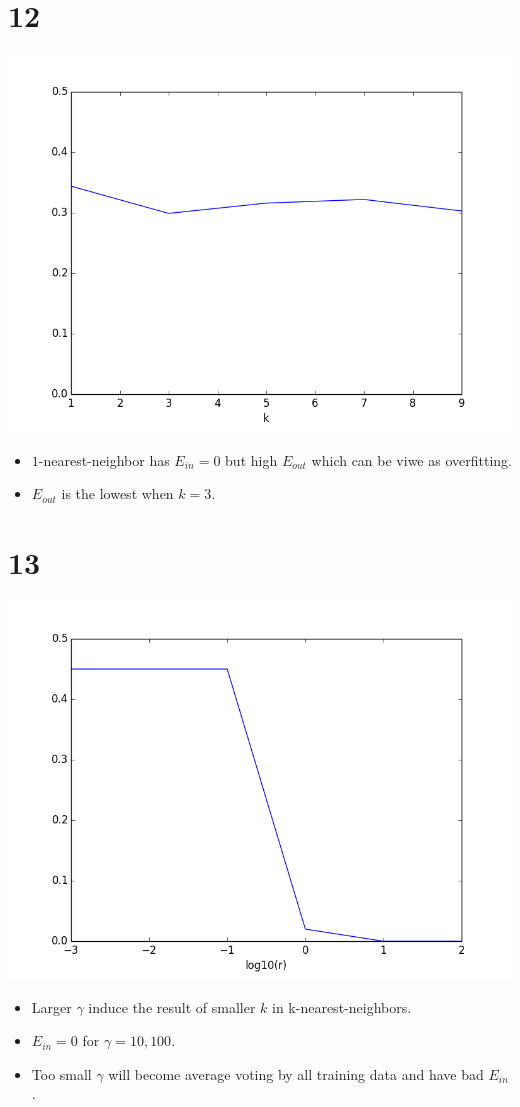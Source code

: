 \documentclass[12pt]{article}
\begin{document}
\section*{12}
\begin{center}
    \includegraphics[scale=0.5]{p12.png}
\end{center}
\begin{itemize}
    \item $1$-nearest-neighbor has $E_{in}=0$ but high $E_{out}$ which can be viwe as overfitting.
    \item $E_{out}$ is the lowest when $k=3$.
\end{itemize}

\section*{13}
\begin{center}
    \includegraphics[scale=0.5]{p13.png}
\end{center}
\begin{itemize}
    \item Larger $\gamma$ induce the result of smaller $k$ in k-nearest-neighbors.
    \item $E_{in}=0$ for $\gamma=10, 100$.
    \item Too small $\gamma$ will become average voting by all training data and have bad $E_{in}$.
\end{itemize}
\end{document}
